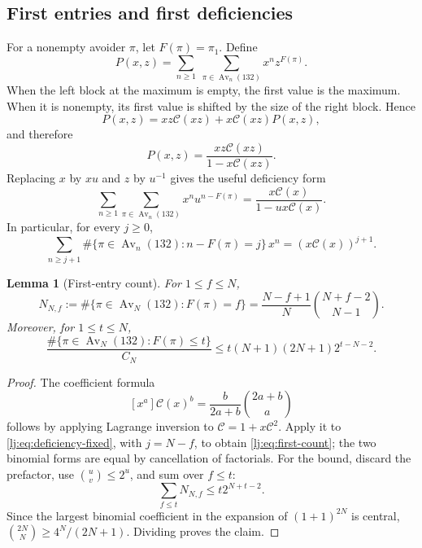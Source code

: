 \documentclass[11pt,a4paper]{article}
\newtheorem{lemma}[lemma]{Lemma}
\theoremstyle{definition}\newaliascnt{definition}{theorem}
\theoremstyle{remark}\newaliascnt{remark}{theorem}
\newcommand{\Av}{\operatorname{Av}}
\newcommand{\Cat}{\mathcal C}
\begin{document}
\subsection{First entries and first deficiencies}
For a nonempty avoider $\pi$, let $F(\pi)=\pi_1$. Define
\[
 P(x,z)=\sum_{n\ge1}\ \sum_{\pi\in\Av_n(132)}x^nz^{F(\pi)}.
\]
When the left block at the maximum is empty, the first value is the
maximum. When it is nonempty, its first value is shifted by the size of
the right block. Hence
\[
 P(x,z)=xz\Cat(xz)+x\Cat(xz)P(x,z),
\]
and therefore
\begin{equation}
 P(x,z)=\frac{xz\Cat(xz)}{1-x\Cat(xz)}.
 \label{lj:eq:first-gf}
\end{equation}
Replacing $x$ by $xu$ and $z$ by $u^{-1}$ gives the useful deficiency form
\begin{equation}
 \sum_{n\ge1}\sum_{\pi\in\Av_n(132)}x^nu^{n-F(\pi)}
 =\frac{x\Cat(x)}{1-ux\Cat(x)}.
 \label{lj:eq:deficiency-gf}
\end{equation}
In particular, for every $j\ge0$,
\begin{equation}
 \sum_{n\ge j+1}
 \#\{\pi\in\Av_n(132):n-F(\pi)=j\}\,x^n
 =(x\Cat(x))^{j+1}.
 \label{lj:eq:deficiency-fixed}
\end{equation}

\begin{lemma}[First-entry count]\label{lj:lem:first-count}
For $1\le f\le N$,
\begin{equation}
 N_{N,f}:=\#\{\pi\in\Av_N(132):F(\pi)=f\}
 =\frac{N-f+1}{N}\binom{N+f-2}{N-1}.
 \label{lj:eq:first-count}
\end{equation}
Moreover, for $1\le t\le N$,
\begin{equation}
 \frac{\#\{\pi\in\Av_N(132):F(\pi)\le t\}}{C_N}
 \le t(N+1)(2N+1)2^{t-N-2}.
 \label{lj:eq:first-small}
\end{equation}
\end{lemma}
\begin{proof}
The coefficient formula
\[
 [x^a]\Cat(x)^b=\frac{b}{2a+b}\binom{2a+b}{a}
\]
follows by applying Lagrange inversion to $\Cat=1+x\Cat^2$.
Apply it to \eqref{lj:eq:deficiency-fixed}, with $j=N-f$, to obtain
\eqref{lj:eq:first-count}; the two binomial forms are equal by cancellation
of factorials. For the bound, discard the prefactor, use
$\binom uv\le2^u$, and sum over $f\le t$:
\[
 \sum_{f\le t}N_{N,f}\le t2^{N+t-2}.
\]
Since the largest binomial coefficient in the expansion of $(1+1)^{2N}$
is central, $\binom{2N}{N}\ge4^N/(2N+1)$. Dividing proves the claim.
\end{proof}
\end{document}
